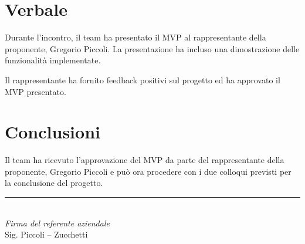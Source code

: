 \documentclass[a4paper,10pt]{article}
\begin{document}
\section*{Verbale}

Durante l'incontro, il team ha presentato il MVP al rappresentante della proponente, Gregorio Piccoli. La presentazione ha incluso una dimostrazione delle funzionalità implementate. 

Il rappresentante ha fornito feedback positivi sul progetto ed ha approvato il MVP presentato.

\section*{Conclusioni}
Il team ha ricevuto l'approvazione del MVP da parte del rappresentante della proponente, Gregorio Piccoli e può ora procedere con i due colloqui previsti per la conclusione del progetto.
\vspace{2cm}
\begin{flushright}
  \noindent\rule{6cm}{0.4pt}\\
  \textit{Firma del referente aziendale}\\
  Sig. Piccoli – Zucchetti
\end{flushright}
\end{document}
